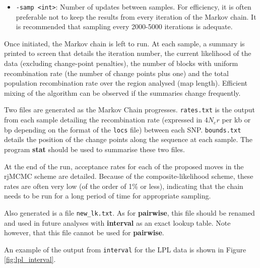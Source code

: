 \documentclass[a4paper,10pt,fullpage]{article}
\begin{document}
\begin{itemize}
\item \verb+-samp <int>+: Number of updates between samples.  For efficiency, it is
often preferable not to keep the results from every iteration of
the Markov chain.  It is recommended that sampling every 2000-5000
iterations is adequate.


\end{itemize}

\noindent  Once initiated, the Markov chain is left to run.  At
each sample, a summary is printed to screen that details the
iteration number, the current likelihood of the data (excluding
change-point penalties), the number of blocks with uniform
recombination rate (the number of change points plus one) and the
total population recombination rate over the region analysed (map
length).  Efficient mixing of the algorithm can be observed if the
summaries change frequently.

Two files are generated as the Markov Chain progresses.  {\verb+rates.txt+} is the output from each sample detailing the
recombination rate (expressed in $4N_er$ per kb or bp depending on
the format of the {\verb+locs+} file) between each SNP.  {\verb+bounds.txt+} details
the position of the change points along the sequence at each
sample.  The program {\bf stat} should be used to summarise these
two files.

At the end of the run, acceptance rates for each of the proposed
moves in the rjMCMC scheme are detailed.  Because of the
composite-likelihood scheme, these rates are often very low (of
the order of 1\% or less), indicating that the chain needs to be
run for a long period of time for appropriate sampling.

Also generated is a file {\verb+new_lk.txt+}.  As for {\bf
pairwise}, this file should be renamed and used in future analyses
with {\bf interval} as an exact lookup table.  Note however, that
this file cannot be used for {\bf pairwise}.

An example of the output from \verb+interval+ for the LPL data is shown in Figure \ref{fig:lpl_interval}.
\end{document}
